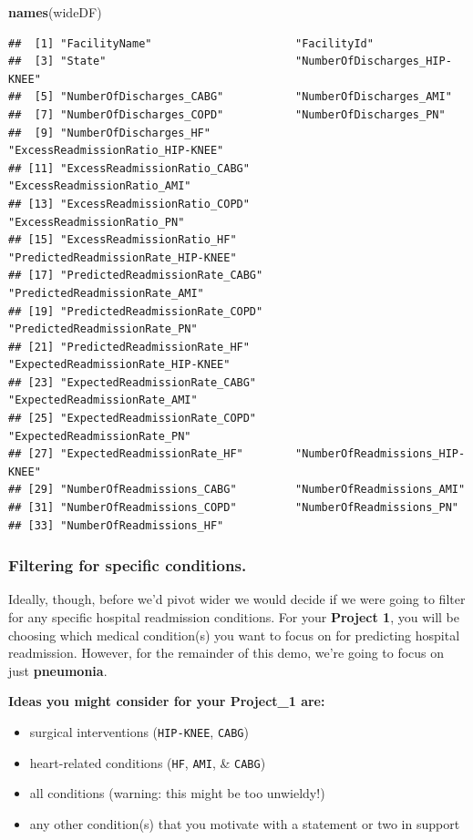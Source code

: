 \documentclass[
]{article}
\newenvironment{Shaded}{\begin{snugshade}}{\end{snugshade}}
\newcommand{\FunctionTok}[1]{\textcolor[rgb]{0.13,0.29,0.53}{\textbf{#1}}}
\newcommand{\NormalTok}[1]{#1}
\providecommand{\tightlist}{%
  \setlength{\itemsep}{0pt}\setlength{\parskip}{0pt}}
\begin{document}
\begin{Shaded}
\begin{Highlighting}[]
\FunctionTok{names}\NormalTok{(wideDF)}
\end{Highlighting}
\end{Shaded}

\begin{verbatim}
##  [1] "FacilityName"                      "FacilityId"                       
##  [3] "State"                             "NumberOfDischarges_HIP-KNEE"      
##  [5] "NumberOfDischarges_CABG"           "NumberOfDischarges_AMI"           
##  [7] "NumberOfDischarges_COPD"           "NumberOfDischarges_PN"            
##  [9] "NumberOfDischarges_HF"             "ExcessReadmissionRatio_HIP-KNEE"  
## [11] "ExcessReadmissionRatio_CABG"       "ExcessReadmissionRatio_AMI"       
## [13] "ExcessReadmissionRatio_COPD"       "ExcessReadmissionRatio_PN"        
## [15] "ExcessReadmissionRatio_HF"         "PredictedReadmissionRate_HIP-KNEE"
## [17] "PredictedReadmissionRate_CABG"     "PredictedReadmissionRate_AMI"     
## [19] "PredictedReadmissionRate_COPD"     "PredictedReadmissionRate_PN"      
## [21] "PredictedReadmissionRate_HF"       "ExpectedReadmissionRate_HIP-KNEE" 
## [23] "ExpectedReadmissionRate_CABG"      "ExpectedReadmissionRate_AMI"      
## [25] "ExpectedReadmissionRate_COPD"      "ExpectedReadmissionRate_PN"       
## [27] "ExpectedReadmissionRate_HF"        "NumberOfReadmissions_HIP-KNEE"    
## [29] "NumberOfReadmissions_CABG"         "NumberOfReadmissions_AMI"         
## [31] "NumberOfReadmissions_COPD"         "NumberOfReadmissions_PN"          
## [33] "NumberOfReadmissions_HF"
\end{verbatim}

\subsubsection{Filtering for specific
conditions.}\label{filtering-for-specific-conditions.}

Ideally, though, before we'd pivot wider we would decide if we were
going to filter for any specific hospital readmission conditions. For
your \textbf{Project 1}, you will be choosing which medical condition(s)
you want to focus on for predicting hospital readmission. However, for
the remainder of this demo, we're going to focus on just
\textbf{pneumonia}.

\textbf{Ideas you might consider for your Project\_1 are:}

\begin{itemize}
\tightlist
\item
  surgical interventions (\texttt{HIP-KNEE}, \texttt{CABG})
\item
  heart-related conditions (\texttt{HF}, \texttt{AMI}, \& \texttt{CABG})
\item
  all conditions (warning: this might be too unwieldy!)
\item
  any other condition(s) that you motivate with a statement or two in
  support
\end{itemize}
\end{document}
